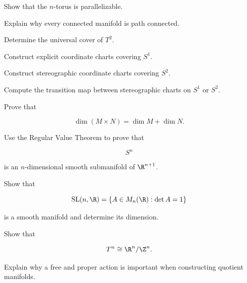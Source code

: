 \begin{exercise}[2]
Show that the \(n\)-torus is parallelizable.
\end{exercise}

\begin{exercise}[2]
Explain why every connected manifold is path connected.
\end{exercise}

\begin{exercise}[2]
Determine the universal cover of \(T^2\).
\end{exercise}

\begin{exercise}[3]
Construct explicit coordinate charts covering \(S^1\).
\end{exercise}

\begin{exercise}[3]
Construct stereographic coordinate charts covering \(S^2\).
\end{exercise}

\begin{exercise}[3]
Compute the transition map between stereographic charts on \(S^1\) or
\(S^2\).
\end{exercise}

\begin{exercise}[3]
Prove that

\[
\dim(M\times N)
=
\dim M+\dim N.
\]
\end{exercise}

\begin{exercise}[3]
Use the Regular Value Theorem to prove that

\[
S^n
\]

is an \(n\)-dimensional smooth submanifold of \(\R^{n+1}\).
\end{exercise}

\begin{exercise}[3]
Show that

\[
\mathrm{SL}(n,\R)
=
\{A\in M_n(\R):\det A=1\}
\]

is a smooth manifold and determine its dimension.
\end{exercise}

\begin{exercise}[3]
Show that

\[
T^n
\cong
\R^n/\Z^n.
\]
\end{exercise}

\begin{exercise}[3]
Explain why a free and proper action is important when constructing quotient
manifolds.
\end{exercise}

